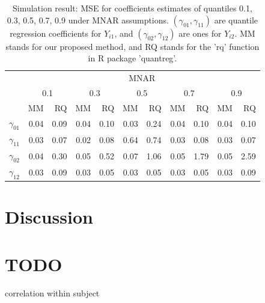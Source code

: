 \documentclass[12pt]{article}
\begin{document}
\begin{table}[h]
  \renewcommand{\arraystretch}{1.3}
  \centering
  \caption{Simulation result: MSE for coefficients estimates of quantiles
    0.1, 0.3, 0.5, 0.7, 0.9 under MNAR assumptions. $(\gamma_{01}, \gamma_{11})$ 
    are quantile regression coefficients for $Y_{i1}$, and $(\gamma_{02}, \gamma_{12})$ 
    are ones for $Y_{i2}$. MM stands for our proposed method, and RQ stands for the 'rq' 
    function in R package 'quantreg'.}
  \vspace{10pt}
  \begin{tabular}{rrrrrrrrrrr}
    \toprule
    & \multicolumn{ 10}{c}{MNAR} \\
    \cline{2-11}
    &  \multicolumn{2}{c}{0.1} &  \multicolumn{2}{c}{0.3} &  \multicolumn{2}{c}{0.5} &  \multicolumn{2}{c}{0.7} &  \multicolumn{2}{c}{0.9} \\
    \cline{2-11}
    & MM & RQ    & MM & RQ    & MM & RQ    & MM & RQ    & MM & RQ \\
    \hline
    $\gamma_{01}$ & 0.04 &0.09&0.04 &0.10 &0.03 &0.24 &0.04 &0.10 &0.04 &0.10 \\
    $\gamma_{11}$ & 0.03 &0.07&0.02 &0.08 &0.64 &0.74 &0.03 &0.08 &0.03 &0.07 \\ 
    $\gamma_{02}$ & 0.04 &0.30&0.05 &0.52 &0.07 &1.06 &0.05 &1.79 &0.05 &2.59 \\ 
    $\gamma_{12}$ & 0.03 &0.09&0.03 &0.05 &0.03 &0.05 &0.03 &0.05 &0.03 &0.09 \\ 
    \bottomrule
  \end{tabular}  \label{tab:sim2}
\end{table}

\section{Discussion}
\label{sec:discussion}
\section{TODO}

correlation within subject

\appendix
\end{document}
